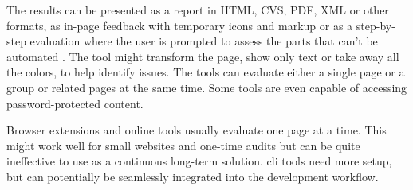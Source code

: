\documentclass{master_thesis}
\begin{document}
The results can be presented as a report in HTML, CVS, PDF, XML or other formats, as in-page feedback with temporary icons and markup or as a step-by-step evaluation where the user is prompted to assess the parts that can't be automated \citep{AbouZahra2017}. The tool might transform the page, show only text or take away all the colors, to help identify issues. The tools can evaluate either a single page or a group or related pages at the same time. Some tools are even capable of accessing password-protected content.

Browser extensions and online tools usually evaluate one page at a time. This might work well for small websites and one-time audits but can be quite ineffective to use as a continuous long-term solution. \Ac{cli} tools need more setup, but can potentially be seamlessly integrated into the development workflow.
\end{document}
